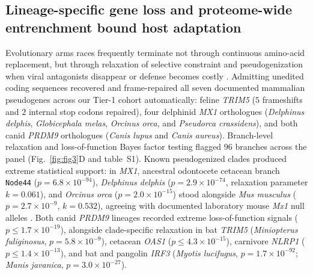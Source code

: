 \documentclass[12pt]{article}
\begin{document}
\subsection*{Lineage-specific gene loss and proteome-wide entrenchment bound host adaptation}

Evolutionary arms races frequently terminate not through continuous amino-acid replacement, but through relaxation of selective constraint and pseudogenization when viral antagonists disappear or defense becomes costly \cite{mcewan2009truncated,braun2015loss,munoz2011orphan}. Admitting unedited coding sequences recovered and frame-repaired all seven documented mammalian pseudogenes across our Tier-1 cohort automatically: feline \textit{TRIM5} ($5$ frameshifts and $2$ internal stop codons repaired), four delphinid \textit{MX1} orthologues (\textit{Delphinus delphis}, \textit{Globicephala melas}, \textit{Orcinus orca}, and \textit{Pseudorca crassidens}), and both canid \textit{PRDM9} orthologues (\textit{Canis lupus} and \textit{Canis aureus}). Branch-level relaxation and loss-of-function Bayes factor testing flagged $96$ branches across the panel (Fig.~\ref{fig:fig3}D and table~S1). Known pseudogenized clades produced extreme statistical support: in \textit{MX1}, ancestral odontocete cetacean branch \texttt{Node44} ($p = 6.8 \times 10^{-94}$), \textit{Delphinus delphis} ($p = 2.9 \times 10^{-74}$, relaxation parameter $k = 0.061$), and \textit{Orcinus orca} ($p = 2.0 \times 10^{-15}$) stood alongside \textit{Mus musculus} ($p = 2.7 \times 10^{-9}$, $k = 0.532$), agreeing with documented laboratory mouse \textit{Mx1} null alleles \cite{staeheli1986mx}. Both canid \textit{PRDM9} lineages recorded extreme loss-of-function signals ($p \le 1.7 \times 10^{-19}$), alongside clade-specific relaxation in bat \textit{TRIM5} (\textit{Miniopterus fuliginosus}, $p = 5.8 \times 10^{-9}$), cetacean \textit{OAS1} ($p \le 4.3 \times 10^{-15}$), carnivore \textit{NLRP1} ($p \le 1.4 \times 10^{-13}$), and bat and pangolin \textit{IRF3} (\textit{Myotis lucifugus}, $p = 1.7 \times 10^{-92}$; \textit{Manis javanica}, $p = 3.0 \times 10^{-27}$).
\end{document}
